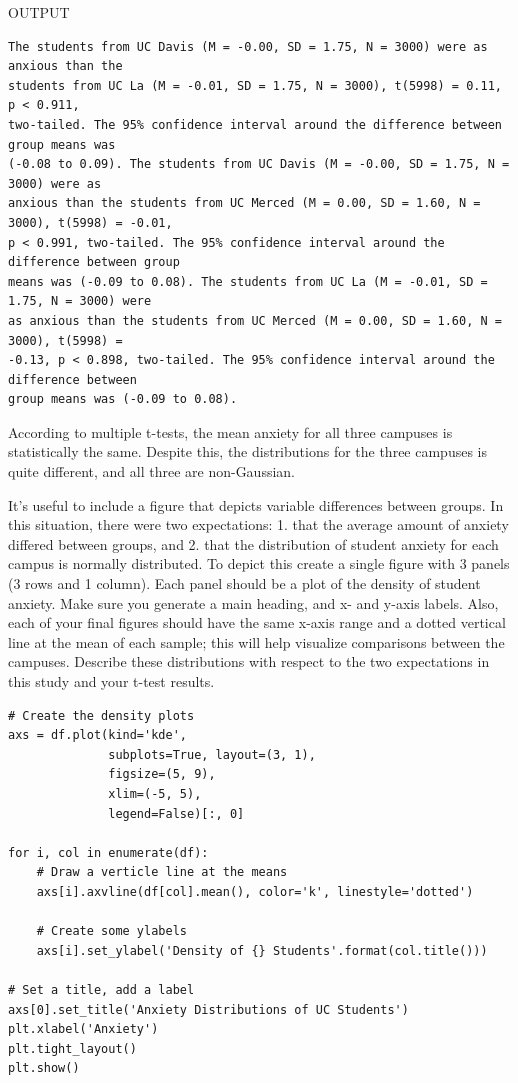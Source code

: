 \documentclass[onecolumn,10pt]{jhwhw}
\begin{document}
\noindent OUTPUT
\begin{lstlisting}[language={}]
The students from UC Davis (M = -0.00, SD = 1.75, N = 3000) were as anxious than the
students from UC La (M = -0.01, SD = 1.75, N = 3000), t(5998) = 0.11, p < 0.911,
two-tailed. The 95% confidence interval around the difference between group means was
(-0.08 to 0.09). The students from UC Davis (M = -0.00, SD = 1.75, N = 3000) were as
anxious than the students from UC Merced (M = 0.00, SD = 1.60, N = 3000), t(5998) = -0.01,
p < 0.991, two-tailed. The 95% confidence interval around the difference between group
means was (-0.09 to 0.08). The students from UC La (M = -0.01, SD = 1.75, N = 3000) were
as anxious than the students from UC Merced (M = 0.00, SD = 1.60, N = 3000), t(5998) =
-0.13, p < 0.898, two-tailed. The 95% confidence interval around the difference between
group means was (-0.09 to 0.08).
\end{lstlisting}
According to multiple t-tests, the mean anxiety for all three campuses is statistically the same. Despite this, the distributions for the three campuses is quite different, and all three are non-Gaussian.

\problem{}
It's useful to include a figure that depicts variable differences between groups. In this situation, there were two expectations: 1. that the average amount of anxiety differed between groups, and 2. that the distribution of student anxiety for each campus is normally distributed. To depict this create a single figure with 3 panels (3 rows and 1 column). Each panel should be a plot of the density of student anxiety. Make sure you generate a main heading, and x- and y-axis labels. Also, each of your final figures should have the same x-axis range and a dotted vertical line at the mean of each sample; this will help visualize comparisons between the campuses. Describe these distributions with respect to the two expectations in this study and your t-test results.
\solution{}

\begin{lstlisting}
# Create the density plots
axs = df.plot(kind='kde',
              subplots=True, layout=(3, 1),
              figsize=(5, 9),
              xlim=(-5, 5),
              legend=False)[:, 0]

for i, col in enumerate(df):
    # Draw a verticle line at the means
    axs[i].axvline(df[col].mean(), color='k', linestyle='dotted')

    # Create some ylabels
    axs[i].set_ylabel('Density of {} Students'.format(col.title()))

# Set a title, add a label
axs[0].set_title('Anxiety Distributions of UC Students')
plt.xlabel('Anxiety')
plt.tight_layout()
plt.show()
\end{lstlisting}
\end{document}
